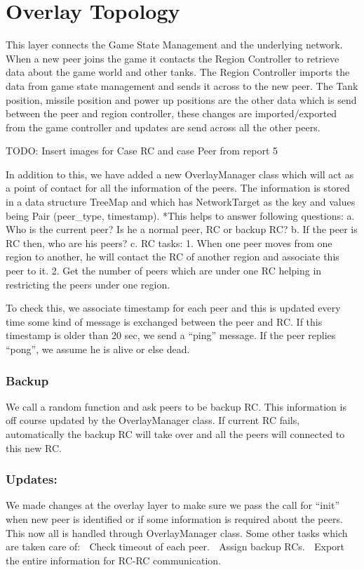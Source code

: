 \documentclass[paper=a4, fontsize=11pt]{scrartcl}
\numberwithin{equation}{section}
\numberwithin{figure}{section}
\numberwithin{table}{section}
\begin{document}
\section{Overlay Topology}
This layer connects the Game State Management and the underlying network. When a new peer joins the game it contacts the Region Controller to retrieve data about the game world and other tanks. The Region Controller imports the data from game state management and sends it across to the new peer.
The Tank position, missile position and power up positions are the other data which is send between the peer and region controller, these changes are imported/exported from the game controller and updates are send across all the other peers.

TODO: Insert images for Case RC and case Peer from report 5

In addition to this, we have added a new OverlayManager class which will act as a point of contact for all the information of the peers.
The information is stored in a data structure TreeMap and which has NetworkTarget as the key and values being Pair (peer_type, timestamp).
*This helps to answer following questions:
a. Who is the current peer? Is he a normal peer, RC or backup RC?
b. If the peer is RC then, who are his peers?
c. RC tasks: 1. When one peer moves from one region to another, he will contact the RC of another region and associate this peer to it. 2. Get the number of peers which are under one RC helping in restricting the peers under one region.

To check this, we associate timestamp for each peer and this is updated every time some kind of message is exchanged between the peer and RC.
If this timestamp is older than 20 sec, we send a “ping” message. If the peer replies “pong”, we assume he is alive or else dead.

\subsubsection{ Backup}

We call a random function and ask peers to be backup RC. This information is off course updated by the OverlayManager class.
If current RC fails, automatically the backup RC will take over and all the peers will connected to this new RC.

\subsubsection{Updates:}
We made changes at the overlay layer to make sure we pass the call for “init” when new peer is identified or if some information is required about the peers. This now all is handled through OverlayManager class.
Some other tasks which are taken care of:
 Check timeout of each peer.
 Assign backup RCs.
 Export the entire information for RC-RC communication.
\end{document}
